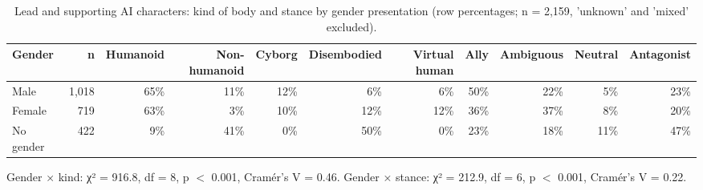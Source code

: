 \begin{table}[htbp]
\centering
\caption{Lead and supporting AI characters: kind of body and stance by gender presentation (row percentages; n = 2,159, 'unknown' and 'mixed' excluded).}
\label{tab:character_gender_kind_stance}
\begin{tabular}{lrrrrrrrrrr}
\toprule
Gender & n & Humanoid & Non-humanoid & Cyborg & Disembodied & Virtual human & Ally & Ambiguous & Neutral & Antagonist \\
\midrule
Male & 1,018 & 65\% & 11\% & 12\% & 6\% & 6\% & 50\% & 22\% & 5\% & 23\% \\
Female & 719 & 63\% & 3\% & 10\% & 12\% & 12\% & 36\% & 37\% & 8\% & 20\% \\
No gender & 422 & 9\% & 41\% & 0\% & 50\% & 0\% & 23\% & 18\% & 11\% & 47\% \\
\bottomrule
\end{tabular}
\par\smallskip\footnotesize Gender × kind: χ² = 916.8, df = 8, p $<$ 0.001, Cramér's V = 0.46. Gender × stance: χ² = 212.9, df = 6, p $<$ 0.001, Cramér's V = 0.22.
\end{table}

